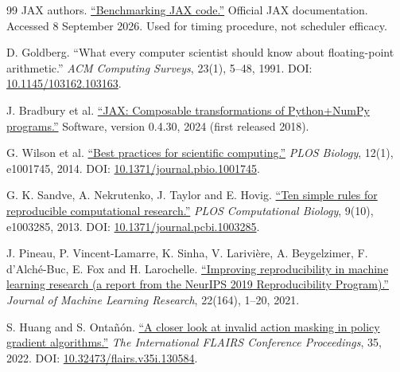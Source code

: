 \documentclass[12pt,a4paper]{article}
\begin{document}
\begin{thebibliography}{99}
 JAX authors. \href{\detokenize{https://docs.jax.dev/en/latest/benchmarking.html}}{``Benchmarking JAX code.''} Official JAX documentation. Accessed 8 September 2026. Used for timing procedure, not scheduler efficacy.

 D. Goldberg. ``What every computer scientist should know about floating-point arithmetic.'' \emph{ACM Computing Surveys}, 23(1), 5--48, 1991. DOI: \href{\detokenize{https://doi.org/10.1145/103162.103163}}{10.1145/103162.103163}.

 J. Bradbury et al. \href{\detokenize{https://github.com/jax-ml/jax}}{``JAX: Composable transformations of Python+NumPy programs.''} Software, version 0.4.30, 2024 (first released 2018).

 G. Wilson et al. \href{\detokenize{https://journals.plos.org/plosbiology/article?id=10.1371/journal.pbio.1001745}}{``Best practices for scientific computing.''} \emph{PLOS Biology}, 12(1), e1001745, 2014. DOI: \href{\detokenize{https://doi.org/10.1371/journal.pbio.1001745}}{10.1371/journal.pbio.1001745}.

 G. K. Sandve, A. Nekrutenko, J. Taylor and E. Hovig. \href{\detokenize{https://journals.plos.org/ploscompbiol/article?id=10.1371/journal.pcbi.1003285}}{``Ten simple rules for reproducible computational research.''} \emph{PLOS Computational Biology}, 9(10), e1003285, 2013. DOI: \href{\detokenize{https://doi.org/10.1371/journal.pcbi.1003285}}{10.1371/journal.pcbi.1003285}.

 J. Pineau, P. Vincent-Lamarre, K. Sinha, V. Larivière, A. Beygelzimer, F. d'Alché-Buc, E. Fox and H. Larochelle. \href{\detokenize{https://jmlr.org/papers/v22/20-303.html}}{``Improving reproducibility in machine learning research (a report from the NeurIPS 2019 Reproducibility Program).''} \emph{Journal of Machine Learning Research}, 22(164), 1--20, 2021.

 S. Huang and S. Ontañón. \href{\detokenize{https://arxiv.org/abs/2006.14171}}{``A closer look at invalid action masking in policy gradient algorithms.''} \emph{The International FLAIRS Conference Proceedings}, 35, 2022. DOI: \href{\detokenize{https://doi.org/10.32473/flairs.v35i.130584}}{10.32473/flairs.v35i.130584}.


\end{thebibliography}
\end{document}

